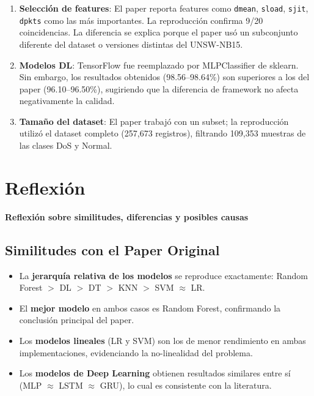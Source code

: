 \documentclass[12pt,a4paper]{article}
\begin{document}
\begin{enumerate}
    \item \textbf{Selección de features}: El paper reporta features como \texttt{dmean},
          \texttt{sload}, \texttt{sjit}, \texttt{dpkts} como las más importantes. La
          reproducción confirma 9/20 coincidencias. La diferencia se explica porque el
          paper usó un subconjunto diferente del dataset o versiones distintas del UNSW-NB15.

    \item \textbf{Modelos DL}: TensorFlow fue reemplazado por MLPClassifier de sklearn.
          Sin embargo, los resultados obtenidos (98.56--98.64\%) son superiores a los
          del paper (96.10--96.50\%), sugiriendo que la diferencia de framework no afecta
          negativamente la calidad.

    \item \textbf{Tamaño del dataset}: El paper trabajó con un subset; la reproducción
          utilizó el dataset completo (257{,}673 registros), filtrando 109{,}353 muestras
          de las clases DoS y Normal.
\end{enumerate}

\section{Reflexión}
\label{sec:reflexion}

\begin{cajaReflexion}
\textbf{Reflexión sobre similitudes, diferencias y posibles causas}
\end{cajaReflexion}

\subsection{Similitudes con el Paper Original}

\begin{itemize}
    \item La \textbf{jerarquía relativa de los modelos} se reproduce exactamente:
          Random Forest $>$ DL $>$ DT $>$ KNN $>$ SVM $\approx$ LR.
    \item El \textbf{mejor modelo} en ambos casos es Random Forest, confirmando la
          conclusión principal del paper.
    \item Los \textbf{modelos lineales} (LR y SVM) son los de menor rendimiento en
          ambas implementaciones, evidenciando la no-linealidad del problema.
    \item Los \textbf{modelos de Deep Learning} obtienen resultados similares entre sí
          (MLP $\approx$ LSTM $\approx$ GRU), lo cual es consistente con la literatura.
\end{itemize}
\end{document}
